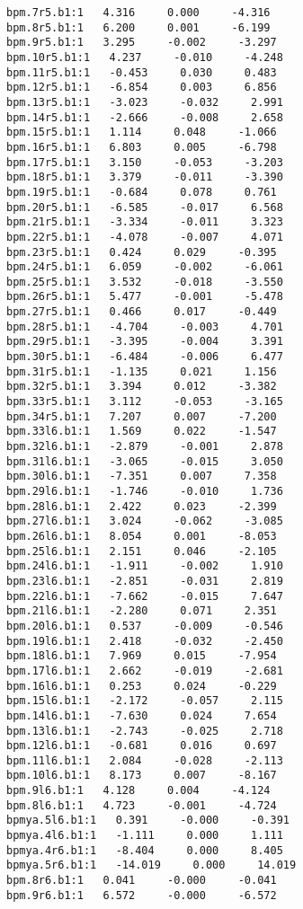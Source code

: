 \begin{verbatim}
bpm.7r5.b1:1   4.316     0.000     -4.316
bpm.8r5.b1:1   6.200     0.001     -6.199
bpm.9r5.b1:1   3.295     -0.002     -3.297
bpm.10r5.b1:1   4.237     -0.010     -4.248
bpm.11r5.b1:1   -0.453     0.030     0.483
bpm.12r5.b1:1   -6.854     0.003     6.856
bpm.13r5.b1:1   -3.023     -0.032     2.991
bpm.14r5.b1:1   -2.666     -0.008     2.658
bpm.15r5.b1:1   1.114     0.048     -1.066
bpm.16r5.b1:1   6.803     0.005     -6.798
bpm.17r5.b1:1   3.150     -0.053     -3.203
bpm.18r5.b1:1   3.379     -0.011     -3.390
bpm.19r5.b1:1   -0.684     0.078     0.761
bpm.20r5.b1:1   -6.585     -0.017     6.568
bpm.21r5.b1:1   -3.334     -0.011     3.323
bpm.22r5.b1:1   -4.078     -0.007     4.071
bpm.23r5.b1:1   0.424     0.029     -0.395
bpm.24r5.b1:1   6.059     -0.002     -6.061
bpm.25r5.b1:1   3.532     -0.018     -3.550
bpm.26r5.b1:1   5.477     -0.001     -5.478
bpm.27r5.b1:1   0.466     0.017     -0.449
bpm.28r5.b1:1   -4.704     -0.003     4.701
bpm.29r5.b1:1   -3.395     -0.004     3.391
bpm.30r5.b1:1   -6.484     -0.006     6.477
bpm.31r5.b1:1   -1.135     0.021     1.156
bpm.32r5.b1:1   3.394     0.012     -3.382
bpm.33r5.b1:1   3.112     -0.053     -3.165
bpm.34r5.b1:1   7.207     0.007     -7.200
bpm.33l6.b1:1   1.569     0.022     -1.547
bpm.32l6.b1:1   -2.879     -0.001     2.878
bpm.31l6.b1:1   -3.065     -0.015     3.050
bpm.30l6.b1:1   -7.351     0.007     7.358
bpm.29l6.b1:1   -1.746     -0.010     1.736
bpm.28l6.b1:1   2.422     0.023     -2.399
bpm.27l6.b1:1   3.024     -0.062     -3.085
bpm.26l6.b1:1   8.054     0.001     -8.053
bpm.25l6.b1:1   2.151     0.046     -2.105
bpm.24l6.b1:1   -1.911     -0.002     1.910
bpm.23l6.b1:1   -2.851     -0.031     2.819
bpm.22l6.b1:1   -7.662     -0.015     7.647
bpm.21l6.b1:1   -2.280     0.071     2.351
bpm.20l6.b1:1   0.537     -0.009     -0.546
bpm.19l6.b1:1   2.418     -0.032     -2.450
bpm.18l6.b1:1   7.969     0.015     -7.954
bpm.17l6.b1:1   2.662     -0.019     -2.681
bpm.16l6.b1:1   0.253     0.024     -0.229
bpm.15l6.b1:1   -2.172     -0.057     2.115
bpm.14l6.b1:1   -7.630     0.024     7.654
bpm.13l6.b1:1   -2.743     -0.025     2.718
bpm.12l6.b1:1   -0.681     0.016     0.697
bpm.11l6.b1:1   2.084     -0.028     -2.113
bpm.10l6.b1:1   8.173     0.007     -8.167
bpm.9l6.b1:1   4.128     0.004     -4.124
bpm.8l6.b1:1   4.723     -0.001     -4.724
bpmya.5l6.b1:1   0.391     -0.000     -0.391
bpmya.4l6.b1:1   -1.111     0.000     1.111
bpmya.4r6.b1:1   -8.404     0.000     8.405
bpmya.5r6.b1:1   -14.019     0.000     14.019
bpm.8r6.b1:1   0.041     -0.000     -0.041
bpm.9r6.b1:1   6.572     -0.000     -6.572

\end{verbatim}
